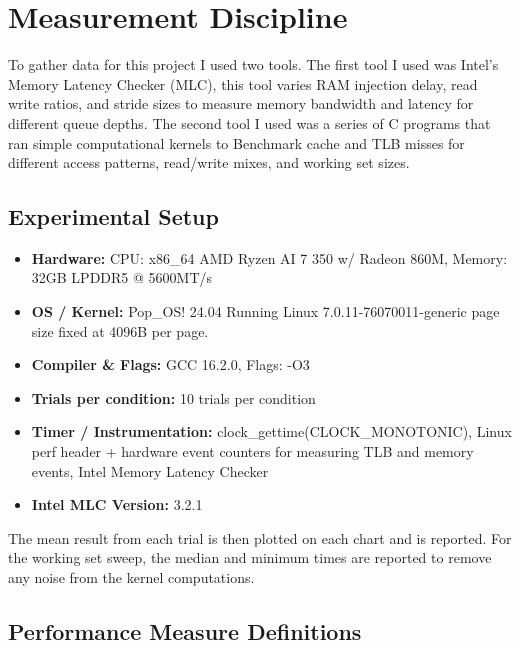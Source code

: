 \documentclass[11pt]{article}
\begin{document}
\section{Measurement Discipline}

To gather data for this project I used two tools. The first tool I used was Intel's Memory Latency Checker (MLC), this
tool varies RAM injection delay, read write ratios, and stride sizes to measure memory bandwidth and latency for
different queue depths. The second tool I used was a series of C programs that ran simple computational kernels to
Benchmark cache and TLB misses for different access patterns, read/write mixes, and working set sizes.

\subsection{Experimental Setup}
\begin{itemize}[leftmargin=1.5em]
	\item \textbf{Hardware:} CPU: x86\_64 AMD Ryzen AI 7 350 w/ Radeon 860M, Memory: 32GB LPDDR5 @ 5600MT/s
	\item \textbf{OS / Kernel:} Pop\_OS! 24.04 Running Linux 7.0.11-76070011-generic page size fixed at 4096B per page.
	\item \textbf{Compiler \& Flags:} GCC 16.2.0, Flags: -O3
	\item \textbf{Trials per condition:} 10 trials per condition
	\item \textbf{Timer / Instrumentation:} clock\_gettime(CLOCK\_MONOTONIC), Linux perf header + hardware event counters for measuring TLB and memory events, Intel Memory Latency Checker
	\item \textbf{Intel MLC Version: } 3.2.1
\end{itemize}

The mean result from each trial is then plotted on each chart and is reported. For the working set sweep, the median
and minimum times are reported to remove any noise from the kernel computations.

\subsection*{Performance Measure Definitions}
\end{document}
